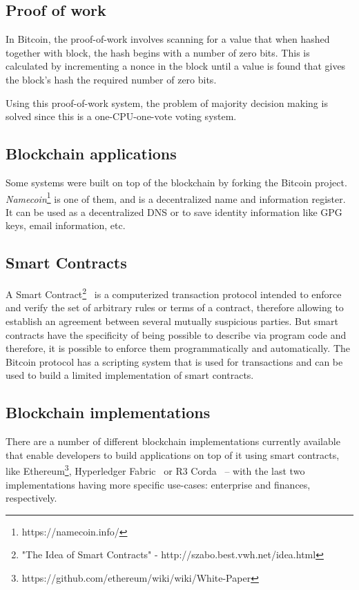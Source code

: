 \subsection{Proof of work}
In Bitcoin, the proof-of-work involves scanning for a value that when hashed together with block, the hash begins with a number of zero bits. This is calculated by incrementing a nonce in the block until a value is found that gives the block's hash the required number of zero bits.

Using this proof-of-work system, the problem of majority decision making is solved since this is a one-CPU-one-vote voting system.

\subsection{Blockchain applications}
Some systems were built on top of the blockchain by forking the Bitcoin project.
\textit{Namecoin}\footnote{https://namecoin.info/} is one of them, and is a decentralized name and information register. It can be used as a decentralized DNS or to save identity information like GPG keys, email information, etc.

\subsection{Smart Contracts} A Smart Contract\footnote{"The Idea of Smart Contracts" - http://szabo.best.vwh.net/idea.html}~\cite{40673} is a computerized transaction protocol intended to enforce and verify the set of arbitrary rules or terms of a contract, therefore allowing to establish an agreement between several mutually suspicious parties. But smart contracts have the specificity of being possible to describe via program code and therefore, it is possible to enforce them programmatically and automatically.
The Bitcoin protocol has a scripting system that is used for transactions and can be used to build a limited implementation of smart contracts.


\subsection{Blockchain implementations}

There are a number of different blockchain implementations currently available that enable developers to build applications on top of it using smart contracts, like Ethereum\footnote{https://github.com/ethereum/wiki/wiki/White-Paper}, Hyperledger Fabric~\cite{cachin2016architecture} or R3 Corda~\cite{mikehearn2016} – with the last two implementations having more specific use-cases: enterprise and finances, respectively.

